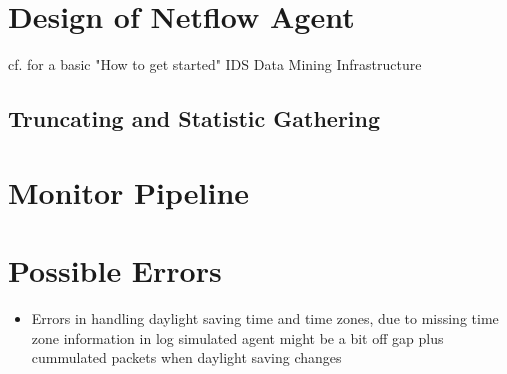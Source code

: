 
\section{Design of Netflow Agent}
	cf. \textcite{Bloedorn2001} for a basic "How to get started" IDS Data Mining Infrastructure
	\subsection{Truncating and Statistic Gathering}

\section{Monitor Pipeline}

\section{Possible Errors}
\begin{itemize}
	\item Errors in handling daylight saving time and time zones, due to missing time zone information in log
		\subitem simulated agent might be a bit off
		\subitem gap plus cummulated packets when daylight saving changes
\end{itemize}
